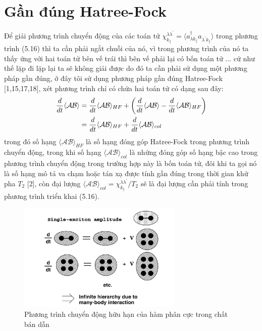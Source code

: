   \section{Gần đúng Hatree-Fock}
  Để giải phương trình chuyển động của các toán tử $\chi_{k_{\parallel}}^{\lambda\lambda^{'}}=\langle a_{\lambda k_{\parallel}}^{\dagger}a_{\lambda^{'} k_{\parallel}}\rangle$ trong phương trình (5.16) thì ta cần phải ngắt chuỗi của nó, vì trong phương trình của nó ta thấy ứng với hai toán tử bên vế trái thì bên vế phải lại có bốn toán tử $\dots$ cứ như thế lặp đi lặp lại ta sẽ không giải được do đó ta cần phải sử dụng một phương pháp gần đúng, ở đây tôi sử dụng phương pháp gần đúng Hatree-Fock [1,15,17,18], xét phương trình chỉ có chứa hai toán tử có dạng sau đây:
  \begin{align}
  \frac{d}{dt}\langle \mathcal{AB}\rangle &= \frac{d}{dt}\langle \mathcal{AB}\rangle_{HF} +\left( \frac{d}{dt}\langle \mathcal{AB}\rangle - \frac{d}{dt}\langle \mathcal{AB}\rangle_{HF}\right)\notag\\
  &=\frac{d}{dt}\langle \mathcal{AB}\rangle_{HF} +\frac{d}{dt}\langle \mathcal{AB}\rangle_{col}
  \end{align}
  trong đó số hạng $\langle \mathcal{AB}\rangle_{HF}$ là số hạng đóng góp Hatree-Fock trong phương trình chuyển động, trong khi số hạng $\langle \mathcal{AB}\rangle_{col}$ là nhứng đóng góp số hạng bậc cao trong phương trình chuyển động trong trường hợp này là bốn toán tử, đôi khi ta gọi nó là số hạng mô tả va chạm hoặc tán xạ được tính gần đúng trong thời gian khử pha $T_2$ [2], còn đại lượng
  $\langle \mathcal{AB}\rangle_{col}=\chi_{k_{\parallel}}^{\lambda\lambda^{'}}/T_2$ sẽ là đại lượng cần phải tính trong phương trình triển khai (5.16). 
  \begin{figure}[hc]
  \centering
  \includegraphics[width=0.70\textwidth]{./Figures/hatree-fock.png}
  \caption[Hatree-Fock]{Phương trình chuyển động hữu hạn của hàm phân cực trong chất bán dẫn}
  \label{fig:Hatree-Fock}
  \end{figure}
